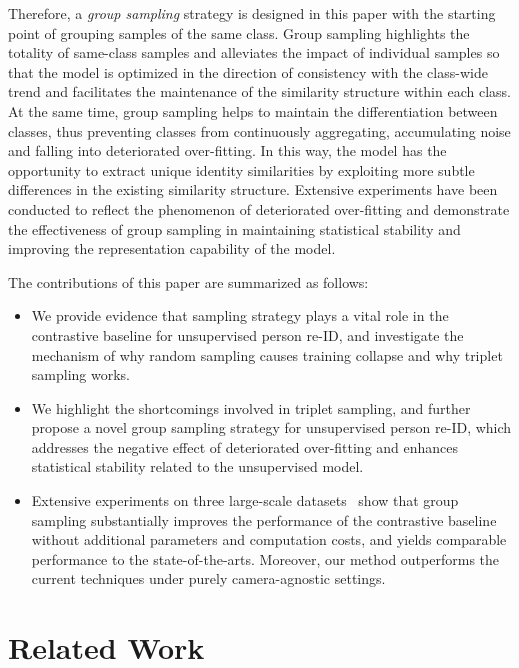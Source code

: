 \documentclass[lettersize,journal]{IEEEtran}
\begin{document}
Therefore, a \emph{group sampling} strategy is designed in this paper with the starting point of grouping samples of the same class.
Group sampling highlights the totality of same-class samples and alleviates the impact of individual samples so that the model is optimized in the direction of consistency with the class-wide trend and facilitates the maintenance of the similarity structure within each class. 
At the same time, group sampling helps to maintain the differentiation between classes, thus preventing classes from continuously aggregating, accumulating noise and falling into deteriorated over-fitting. In this way, the model has the opportunity to extract unique identity similarities by exploiting more subtle differences in the existing similarity structure.
Extensive experiments have been conducted to reflect the phenomenon of deteriorated over-fitting and demonstrate the effectiveness of group sampling in maintaining statistical stability and improving the representation capability of the model.

The contributions of this paper are summarized as follows: 
\begin{itemize}[leftmargin=*]
    \item We provide evidence that sampling strategy plays a vital role in the contrastive baseline for unsupervised person re-ID, and investigate the mechanism of why random sampling causes training collapse and why triplet sampling works.

    \item We highlight the shortcomings involved in triplet sampling, and further propose a novel group sampling strategy for unsupervised person re-ID, which addresses the negative effect of deteriorated over-fitting and enhances statistical stability related to the unsupervised model.
    
    \item Extensive experiments on three large-scale datasets~\cite{Market,Duke,MSMT} show that group sampling substantially improves the performance of the contrastive baseline without additional parameters and computation costs, and yields comparable performance to the state-of-the-arts. Moreover, our method outperforms the current techniques under purely camera-agnostic settings.
\end{itemize}

\section{Related Work}
\end{document}
